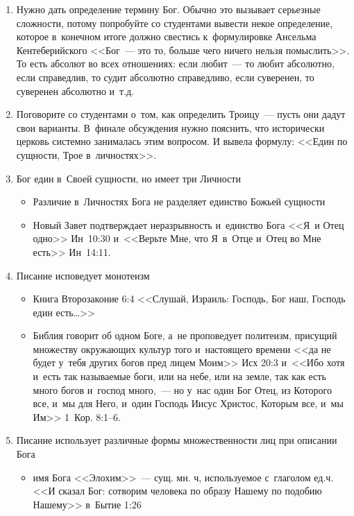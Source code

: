 \documentclass[a4paper,12pt]{article}
\begin{document}
\begin{enumerate}    

    \item Нужно дать определение термину Бог. Обычно это вызывает серьезные сложности, потому попробуйте со студентами вывести некое определение, которое в~конечном итоге должно свестись к~формулировке Ансельма Кентеберийского <<Бог~--- это то, больше чего ничего нельзя помыслить>>.
    То есть абсолют во всех отношениях: если любит~--- то любит абсолютно, если справедлив, то судит абсолютно справедливо, если суверенен, то суверенен абсолютно и~т.д.
    \item Поговорите со студентами о~том, как определить Троицу~--- пусть они дадут свои варианты. В~финале обсуждения нужно пояснить, что исторически церковь системно занималась этим вопросом. И вывела формулу: <<Един по сущности, Трое в~личностях>>.
    \item Бог един в~Своей сущности, но имеет три Личности
    \begin{itemize}
        \item Различие в~Личностях Бога не разделяет единство Божьей сущности
        \item Новый Завет подтверждает неразрывность и~единство Бога <<Я~и Отец одно>> Ин~10:30 и~<<Верьте Мне, что Я~в~Отце и~Отец во Мне есть>> Ин~14:11.
    \end{itemize}
    \item Писание исповедует монотеизм
        \begin{itemize}
        \item Книга Второзаконие 6:4 <<Слушай, Израиль: Господь, Бог наш, Господь един есть…>>
        \item Библия говорит об одном Боге, а~не проповедует политеизм, присущий множеству окружающих культур того и~настоящего времени <<да не будет у~тебя других богов пред лицем Моим>> Исх 20:3 и~<<Ибо хотя и~есть так называемые боги, или на небе, или на земле, так как есть много богов и~господ много,~--- но у~нас один Бог Отец, из Которого все, и~мы для Него, и~один Господь Иисус Христос, Которым все, и~мы Им>> 1~Кор. 8:1--6.
        \end{itemize}
    \item Писание использует различные формы множественности лиц при описании Бога
        \begin{itemize}
        \item имя Бога <<Элохим>>~--- сущ. мн. ч, используемое с~глаголом ед.ч. <<И сказал Бог: сотворим человека по образу Нашему по подобию Нашему>> в~Бытие 1:26

\end{itemize}
\end{enumerate}
\end{document}
